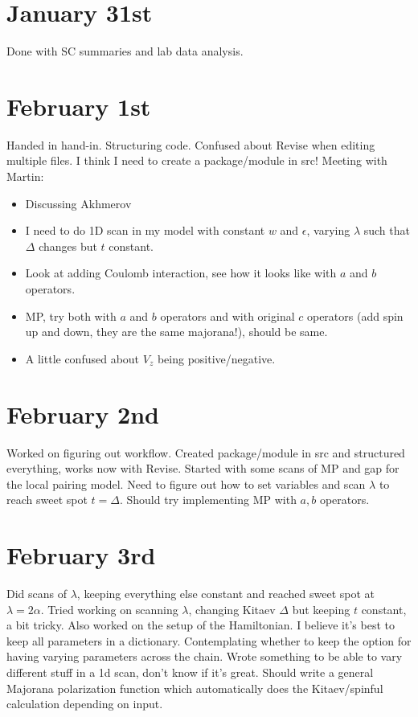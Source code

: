 \documentclass{article}
\begin{document}
\section*{January 31st}
Done with SC summaries and lab data analysis.
\section*{February 1st}
Handed in hand-in. Structuring code. Confused about Revise when editing multiple files. I think I need to create a package/module in src! Meeting with Martin:
\begin{itemize}
    \item Discussing Akhmerov
    \item I need to do 1D scan in my model with constant $w$ and $\epsilon$, varying $\lambda$ such that $\Delta$ changes but $t$ constant.
    \item Look at adding Coulomb interaction, see how it looks like with $a$ and $b$ operators.
    \item MP, try both with $a$ and $b$ operators and with original $c$ operators (add spin up and down, they are the same majorana!), should be same.
    \item A little confused about $V_z$ being positive/negative.
\end{itemize}
\section*{February 2nd}
Worked on figuring out workflow. Created package/module in src and structured everything, works now with Revise. Started with some scans of MP and gap for the local pairing model. Need to figure out how to set variables and scan $\lambda$ to reach sweet spot $t=\Delta$. Should try implementing MP with $a, b$ operators.
\section*{February 3rd}
Did scans of $\lambda$, keeping everything else constant and reached sweet spot at $\lambda = 2\alpha$. Tried working on scanning $\lambda$, changing Kitaev $\Delta$ but keeping $t$ constant, a bit tricky. Also worked on the setup of the Hamiltonian. I believe it's best to keep all parameters in a dictionary. Contemplating whether to keep the option for having varying parameters across the chain. Wrote something to be able to vary different stuff in a 1d scan, don't know if it's great. Should write a general Majorana polarization function which automatically does the Kitaev/spinful calculation depending on input.
\end{document}
